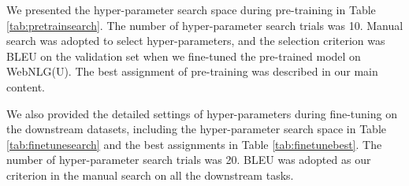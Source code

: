 \documentclass[11pt,a4paper]{article}
\begin{document}
\begin{table} [!htp]
\centering
\scriptsize
{}
\caption{Best assignments of hyper-parameters on the downstream datasets.}
\label{tab:finetunebest}
\end{table}


We presented the hyper-parameter search space during pre-training in Table \ref{tab:pretrainsearch}. The number of hyper-parameter search trials was 10. Manual search was adopted to select hyper-parameters, and the selection criterion was BLEU on the validation set when we fine-tuned the pre-trained model on WebNLG(U). The best assignment of pre-training was described in our main content.



We also provided the detailed settings of hyper-parameters during fine-tuning on the downstream datasets, including the hyper-parameter search space in Table \ref{tab:finetunesearch} and the best assignments in Table \ref{tab:finetunebest}. The number of hyper-parameter search trials was 20. BLEU was adopted as our criterion in the manual search on all the downstream tasks.
\end{document}
